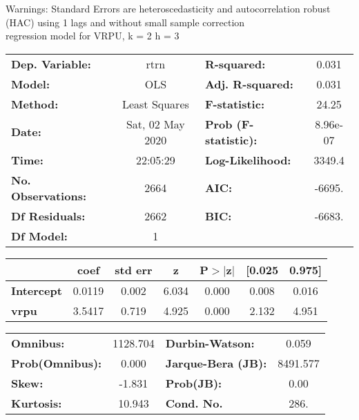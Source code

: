 Warnings: \newline
 [1] Standard Errors are heteroscedasticity and autocorrelation robust (HAC) using 1 lags and without small sample correction\\ 

regression model for VRPU, k = 2 h = 3\begin{center}
\begin{tabular}{lclc}
\toprule
\textbf{Dep. Variable:}    &       rtrn       & \textbf{  R-squared:         } &     0.031   \\
\textbf{Model:}            &       OLS        & \textbf{  Adj. R-squared:    } &     0.031   \\
\textbf{Method:}           &  Least Squares   & \textbf{  F-statistic:       } &     24.25   \\
\textbf{Date:}             & Sat, 02 May 2020 & \textbf{  Prob (F-statistic):} &  8.96e-07   \\
\textbf{Time:}             &     22:05:29     & \textbf{  Log-Likelihood:    } &    3349.4   \\
\textbf{No. Observations:} &        2664      & \textbf{  AIC:               } &    -6695.   \\
\textbf{Df Residuals:}     &        2662      & \textbf{  BIC:               } &    -6683.   \\
\textbf{Df Model:}         &           1      & \textbf{                     } &             \\
\bottomrule
\end{tabular}
\begin{tabular}{lcccccc}
                   & \textbf{coef} & \textbf{std err} & \textbf{z} & \textbf{P$> |$z$|$} & \textbf{[0.025} & \textbf{0.975]}  \\
\midrule
\textbf{Intercept} &       0.0119  &        0.002     &     6.034  &         0.000        &        0.008    &        0.016     \\
\textbf{vrpu}      &       3.5417  &        0.719     &     4.925  &         0.000        &        2.132    &        4.951     \\
\bottomrule
\end{tabular}
\begin{tabular}{lclc}
\textbf{Omnibus:}       & 1128.704 & \textbf{  Durbin-Watson:     } &    0.059  \\
\textbf{Prob(Omnibus):} &   0.000  & \textbf{  Jarque-Bera (JB):  } & 8491.577  \\
\textbf{Skew:}          &  -1.831  & \textbf{  Prob(JB):          } &     0.00  \\
\textbf{Kurtosis:}      &  10.943  & \textbf{  Cond. No.          } &     286.  \\
\bottomrule
\end{tabular}
\end{center}

